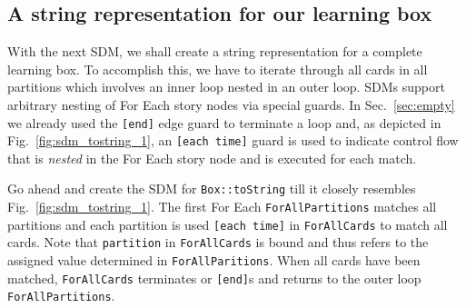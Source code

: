 \subsection{A string representation for our learning box}

With the next SDM, we shall create a string representation for a complete
learning box. To accomplish this, we have to iterate through all cards in all
partitions which involves an inner loop nested in an outer loop.  SDMs support arbitrary nesting
of For Each story nodes via special guards.  In Sec.~\ref{sec:empty} we already
used the \texttt{[end]} edge guard to terminate a loop and, as depicted in
Fig.~\ref{fig:sdm_tostring_1}, an \texttt{[each time]} guard is used to indicate
control flow that is \emph{nested} in the For Each story node and is executed
for each match.

Go ahead and create the SDM for \texttt{Box::toString} till it closely resembles
Fig.~\ref{fig:sdm_tostring_1}.  The first For Each \texttt{ForAllPartitions}
matches all partitions and each partition is used \texttt{[each time]} in
\texttt{ForAllCards} to match all cards.  Note that \texttt{partition} in
\texttt{ForAllCards} is bound  and thus refers to the assigned value determined
in \texttt{ForAllParitions}.  When all cards have been matched,
\texttt{ForAllCards} terminates or \texttt{[end]}s and returns to the outer loop
\texttt{ForAllPartitions}.

